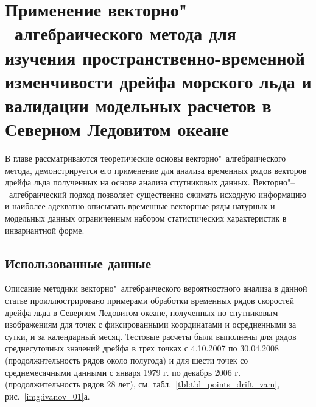 \chapter{Применение векторно"--~алгебраического метода для изучения пространственно-временной изменчивости дрейфа морского льда и валидации модельных расчетов в Северном Ледовитом океане} \label{chapt3}


В главе рассматриваются теоретические основы векторно"~алгебраического метода, демонстрируется его применение для анализа временных рядов векторов дрейфа льда полученных на основе анализа спутниковых данных. Векторно"--~алгебраический подход позволяет существенно сжимать исходную информацию и наиболее адекватно описывать временные векторные ряды натурных и модельных данных ограниченным набором статистических характеристик в инвариантной форме.

\section{Использованные данные} \label{sect3_1}

Описание методики векторно"~алгебраического вероятностного анализа в данной статье проиллюстрировано примерами обработки временных рядов скоростей дрейфа льда в Северном Ледовитом океане, полученных по спутниковым изображениям для точек с фиксированными координатами и осредненными за сутки, и за календарный месяц. Тестовые расчеты были выполнены для рядов среднесуточных значений дрейфа в трех точках с 4.10.2007 по 30.04.2008 (продолжительность рядов около полугода) и для шести точек со среднемесячными данными с января 1979 г. по декабрь 2006 г. (продолжительность рядов 28 лет), см. табл.~\ref{tbl:tbl_points_drift_vam}, рис.~\ref{img:ivanov_01}а.

